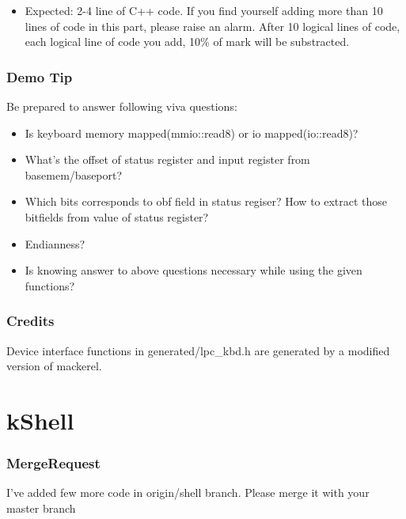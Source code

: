 \documentclass[]{book}
\begin{document}
\begin{itemize}
\itemsep1pt\parskip0pt
\item
  Expected: 2-4 line of C++ code. If you find yourself adding more than
  10 lines of code in this part, please raise an alarm. After 10 logical
  lines of code, each logical line of code you add, 10\% of mark will be
  substracted.
\end{itemize}

\subsubsection*{Demo Tip}\label{demo-tip-2}

Be prepared to answer following viva questions:

\begin{itemize}
\itemsep1pt\parskip0pt
\item
  Is keyboard memory mapped(mmio::read8) or io mapped(io::read8)?
\item
  What's the offset of status register and input register from
  basemem/baseport?
\item
  Which bits corresponds to obf field in status regiser? How to extract
  those bitfields from value of status register?
\item
  Endianness?
\item
  Is knowing answer to above questions necessary while using the given
  functions?
\end{itemize}

\subsubsection*{Credits}\label{credits}

Device interface functions in generated/lpc\_kbd.h are generated by a
modified version of mackerel.

\section{kShell}\label{kshell}

\subsubsection*{MergeRequest}\label{mergerequest-3}

I've added few more code in origin/shell branch. Please merge it with
your master branch
\end{document}

